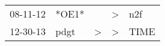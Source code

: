 \begin{supertabular}{lllll}
 08-11-12 &  *OE1* &               &  \textgreater &   n2f \\
 12-30-13 &   pdgt &  \textgreater &  \textgreater &  TIME \\
\end{supertabular}
